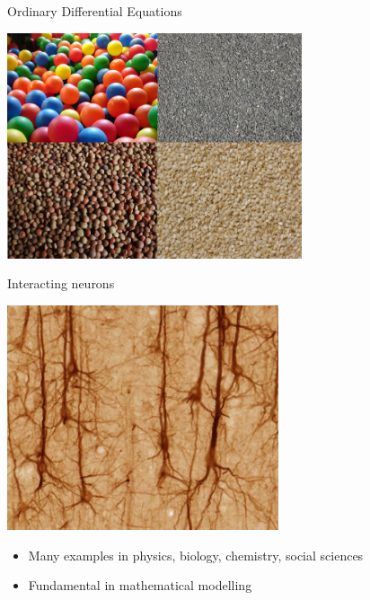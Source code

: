 \documentclass{beamer}
\begin{document}
\begin{frame}{Ordinary Differential Equations}
\begin{minipage}{0.48\textwidth}
\begin{center}
  \includegraphics[draft=false,width=0.65\textwidth]{granular_system.png}
 \end{center}
\end{minipage}
\pause
\begin{minipage}{0.48\textwidth}
 \begin{center}
  Interacting neurons

  \includegraphics[draft=false,width=0.6\textwidth]{neuron.jpg}
 \end{center}
\end{minipage}
\pause
\vspace{2ex}

\begin{itemize}
 \item Many examples in physics, biology, chemistry, social sciences
 \item Fundamental in mathematical modelling
\end{itemize}

% 

\end{frame}
\end{document}
